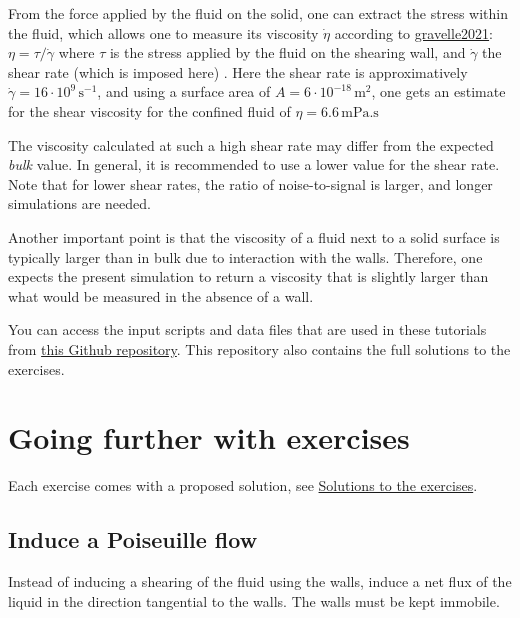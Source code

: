 \vspace{0.25cm} \noindent From the force applied by the fluid on the solid, one can
extract the stress within the fluid, which allows one to
measure its viscosity $\dot{\eta}$ 
according to \href{https://pure.tudelft.nl/ws/portalfiles/portal/89280267/PhysRevFluids.6.034303.pdf}{gravelle2021}:
$\eta = \tau / \dot{\gamma}$ where $\tau$
is the stress applied by the fluid on the shearing wall, and
$\dot{\gamma}$ the shear rate (which is imposed
here) \cite{gravelle2021violations}. Here the shear rate
is approximatively $\dot{\gamma} = 16 \cdot 10^9\,\text{s}^{-1}$,
and using a surface area of $A = 6 \cdot 10^{-18}\,\text{m}^2$, one
gets an estimate for the shear viscosity for the confined
fluid of $\eta = 6.6\,\text{mPa.s}$

\vspace{0.25cm} \noindent The viscosity calculated at such a high shear rate may
differ from the expected \textit{bulk} value. In general, it is recommended to use a lower
value for the shear rate. Note that for lower shear rates, the ratio of noise-to-signal
is larger, and longer simulations are needed.

\vspace{0.25cm} \noindent Another important point is that the viscosity of a fluid next to a solid surface is
typically larger than in bulk due to interaction with the
walls. Therefore, one expects the present simulation to return 
a viscosity that is slightly larger than what would
be measured in the absence of a wall.

\vspace{0.25cm} \noindent You can access the input scripts and data files that
are used in these tutorials from \href{https://github.com/lammpstutorials/lammpstutorials-inputs/}{this Github repository}.
This repository also contains the full solutions to the exercises.

\section{Going further with exercises}
\noindent Each exercise comes with a proposed solution, 
see \hyperref[solutions-label]{Solutions to the exercises}.

\subsection{Induce a Poiseuille flow}
\noindent Instead of inducing a shearing of the fluid using the walls,
induce a net flux of the liquid in the direction tangential
to the walls. The walls must be kept immobile.

